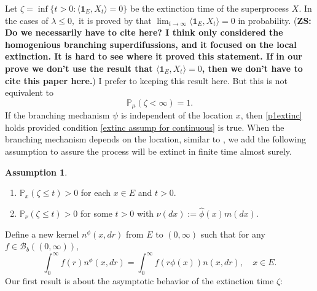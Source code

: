 \documentclass[12pt,a4paper]{amsart}
\theoremstyle{plain}
\theoremstyle{definition}
\newtheorem{asp}{Assumption}
\numberwithin{equation}{section}
\begin{document}
Let $\zeta=\inf\{t>0: \langle \mathbf 1_E,X_t\rangle=0\}$ be the extinction time
of the superprocess $X$. In the cases of $\lambda\leq 0,$ it is proved by
\cite{EnglanderKyprianou2004Local} that $\lim_{t\rightarrow\infty} \langle
\mathbf 1_E,X_t\rangle=0 $ in probability. ({\bf ZS: Do we necessarily have to
  cite \cite{EnglanderKyprianou2004Local} here? I think
  \cite{EnglanderKyprianou2004Local} only considered the homogenious branching
  superdifussions, and it focused on the local extinction. It is hard to see
  where it proved this statement. If in our prove we don't use the result that
  $\langle \mathbf 1_E,X_t\rangle=0$, then we don't have to cite this paper
  here.}) {\color{red} I prefer to keeping this result here.} But this is not
equivalent to
\begin{equation}\label{p1extinc}
	\mathbb P_\mu(\zeta<\infty)=1.
\end{equation}
If the branching mechanism $\psi$ is independent of the location $x$, then
\eqref{p1extinc} holds provided condition \eqref{extinc assump  for continuous}
is true. When the branching mechanism depends on the location, similar to
\cite{RenSongSun2017Spine,RenSongZhang2018Williams}, we add the following
assumption to assure the process will be extinct in finite time almost surely.

\begin{asp} \label{asp: 3}
\begin{enumerate}
\item \label{subasp: point non-presistence}
	$\mathbb P_{x}(\zeta \leq t)>0$ for each $x\in E$ and $t>0$.
\item \label{subasp: measure non-presistence}
  $\mathbb P_{\nu}(\zeta\leq t)>0$ for some $t>0$ with $\nu(dx):=\hat\phi(x)m(dx)$.
\end{enumerate}
\end{asp}


Define a new kernel $n^\phi(x, dr)$ from $E$ to $(0,\infty)$ such that for any $f\in\mathcal B_b((0,\infty))$,
\begin{equation} \label{phi-change}
	\int_0^\infty f(r)n^\phi(x,dr)=\int_0^\infty f(r\phi(x))n(x, dr),
	\quad x\in E.
\end{equation}
Our first result is about the asymptotic behavior of the extinction time $\zeta$:
\end{document}
